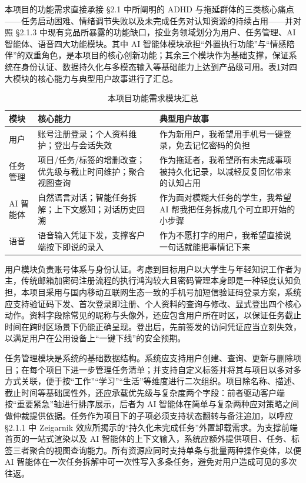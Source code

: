 \par 本项目的功能需求直接承接 §2.1 中所阐明的 ADHD 与拖延群体的三类核心痛点——任务启动困难、情绪调节失败以及未完成任务对认知资源的持续占用——并对照 §2.1.3 中现有竞品所暴露的功能缺口，按业务领域划分为用户、任务管理、AI 智能体、语音四大功能模块。其中 AI 智能体模块承担``外置执行功能''与``情感陪伴''的双重角色，是本项目的核心创新功能；其余三个模块作为基础支撑，保证系统在身份认证、数据持久化与多模态输入等基础能力上达到产品级可用。表\ref{tab:functional-requirements}对四大模块的核心能力与典型用户故事进行了汇总。
\begin{table}[htbp]
  \centering
  \caption{本项目功能需求模块汇总}
  \label{tab:functional-requirements}
  \begin{tabular}{p{2cm}p{4.5cm}p{6cm}}
    \hline
    模块 & 核心能力 & 典型用户故事 \\
    \hline
    用户 & 账号注册登录；个人资料维护；登出与会话失效 & 作为新用户，我希望用手机号一键登录，免去记忆密码的负担 \\
    任务管理 & 项目/任务/标签的增删改查；优先级与截止时间维护；聚合视图查询 & 作为拖延者，我希望所有未完成事项被持久化记录，以减轻反复回忆带来的认知占用 \\
    AI 智能体 & 自然语言对话；智能任务拆解；上下文感知；对话历史回溯 & 作为面对模糊大任务的学生，我希望 AI 帮我把任务拆成几个可立即开始的小步骤 \\
    语音 & 语音输入凭证下发，支撑客户端按下即说的录入 & 作为不愿打字的用户，我希望直接说一句话就能把事情记下来 \\
    \hline
  \end{tabular}
\end{table}

\par 用户模块负责账号体系与身份认证。考虑到目标用户以大学生与年轻知识工作者为主，传统邮箱加密码注册流程的执行鸿沟较大且密码管理本身即是一种轻度认知负担，本项目采用与国内移动互联网生态一致的手机号加短信验证码登录方案，系统应支持验证码下发、首次登录即注册、个人资料的查询与修改、显式登出四个核心动作。资料字段除常见的昵称与头像外，还应包含用户所在时区，以保证任务截止时间在跨时区场景下仍能正确呈现。登出后，先前签发的访问凭证应当立刻失效，以满足用户在公用设备上``一键下线''的安全预期。

\par 任务管理模块是系统的基础数据结构。系统应支持用户创建、查询、更新与删除项目；在每个项目下进一步管理任务清单；并支持自定义标签并将其与项目以多对多方式关联，便于按``工作''``学习''``生活''等维度进行二次组织。项目除名称、描述、截止时间等基础属性外，还应承载优先级与复杂度两个字段：前者驱动客户端按``重要紧急''轴进行排序展示，后者为 AI 智能体在简单与复杂两种应对策略之间做仲裁提供依据。任务作为项目下的子项必须支持状态翻转与备注追加，以呼应 §2.1.1 中 Zeigarnik 效应所揭示的``持久化未完成任务''外置卸载需求。为支撑前端首页的一站式渲染以及 AI 智能体的上下文输入，系统应额外提供项目、任务、标签三者聚合的视图查询能力。所有资源应同时支持单条与批量两种操作变体，以便 AI 智能体在一次任务拆解中可一次性写入多条任务，避免对用户造成可见的多次往返。

